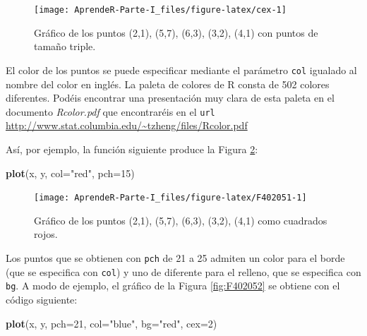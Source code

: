 \documentclass[]{book}
\newenvironment{Shaded}{\begin{snugshade}}{\end{snugshade}}
\newcommand{\DataTypeTok}[1]{\textcolor[rgb]{0.13,0.29,0.53}{#1}}
\newcommand{\DecValTok}[1]{\textcolor[rgb]{0.00,0.00,0.81}{#1}}
\newcommand{\KeywordTok}[1]{\textcolor[rgb]{0.13,0.29,0.53}{\textbf{#1}}}
\newcommand{\NormalTok}[1]{#1}
\newcommand{\StringTok}[1]{\textcolor[rgb]{0.31,0.60,0.02}{#1}}
\theoremstyle{definition}
\theoremstyle{definition}
\theoremstyle{definition}
\theoremstyle{remark}
\begin{document}
\begin{figure}

{\centering \texttt{[image: AprendeR-Parte-I\_files/figure-latex/cex-1]} 

}

\caption{Gráfico de los puntos (2,1), (5,7), (6,3), (3,2), (4,1) con puntos de tamaño triple.}\label{fig:cex}
\end{figure}

El color de los puntos se puede especificar mediante el parámetro \texttt{col} igualado al nombre del color en inglés. La paleta de colores de R consta de 502 colores diferentes. Podéis encontrar una presentación muy clara de esta paleta en el documento \emph{Rcolor.pdf} que encontraréis en el \texttt{url} \url{http://www.stat.columbia.edu/~tzheng/files/Rcolor.pdf}

Así, por ejemplo, la función siguiente produce la Figura \ref{fig:F402051}:

\begin{Shaded}
\begin{Highlighting}[]
\KeywordTok{plot}\NormalTok{(x, y, }\DataTypeTok{col=}\StringTok{"red"}\NormalTok{, }\DataTypeTok{pch=}\DecValTok{15}\NormalTok{)}
\end{Highlighting}
\end{Shaded}

\begin{figure}

{\centering \texttt{[image: AprendeR-Parte-I\_files/figure-latex/F402051-1]} 

}

\caption{Gráfico de los puntos (2,1), (5,7), (6,3), (3,2), (4,1) como cuadrados rojos.}\label{fig:F402051}
\end{figure}

Los puntos que se obtienen con \texttt{pch} de 21 a 25 admiten un color para el borde (que se especifica con \texttt{col}) y uno de diferente para el relleno, que se especifica con \texttt{bg}. A modo de ejemplo, el gráfico de la Figura \ref{fig:F402052} se obtiene con el código siguiente:

\begin{Shaded}
\begin{Highlighting}[]
\KeywordTok{plot}\NormalTok{(x, y, }\DataTypeTok{pch=}\DecValTok{21}\NormalTok{, }\DataTypeTok{col=}\StringTok{"blue"}\NormalTok{, }\DataTypeTok{bg=}\StringTok{"red"}\NormalTok{, }\DataTypeTok{cex=}\DecValTok{2}\NormalTok{)}
\end{Highlighting}
\end{Shaded}
\end{document}
